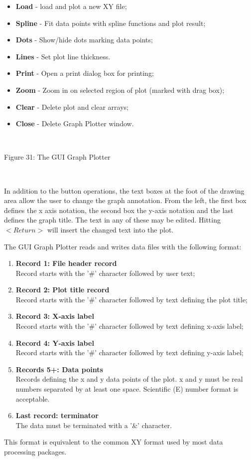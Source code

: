 \begin{itemize}
\item {\bf Load} - load and plot a new XY file;
\item {\bf Spline} - Fit data points with spline functions and plot result;
\item {\bf Dots} - Show/hide dots marking data points;
\item {\bf Lines} - Set plot line thickness.
\item {\bf Print} - Open a print dialog box for printing;
\item {\bf Zoom} - Zoom in on selected region of plot (marked with drag box);
\item {\bf Clear} - Delete plot and clear arrays;
\item {\bf Close} - Delete Graph Plotter window.
\end{itemize}

~

\begin{center}
\centerline{}
\centerline{Figure 31: The GUI Graph Plotter}
\end{center}

~

\noindent
In addition to the button operations, the text boxes at the foot of
the drawing area allow the user to change the graph annotation. From
the left, the first box defines the x axis notation, the second
box the y-axis notation and the last defines the graph title. The text
in any of these may be edited. Hitting $<Return>$ will insert the
changed text into the plot.

The GUI Graph Plotter reads and writes data files with the following
format:
\begin{enumerate}
\item {\bf Record 1: File header record}\\
Record starts with the '\#' character followed by user text;
\item {\bf Record 2: Plot title record}\\
Record starts with the '\#' character followed by text defining
the plot title;
\item {\bf Record 3: X-axis label}\\
Record starts with the '\#' character followed by text defining
x-axis label;
\item {\bf Record 4: Y-axis label}\\
Record starts with the '\#' character followed by text defining
y-axis label;
\item {\bf Records 5+: Data points}\\
Records defining the x and y data points of the plot. x and y must be
real numbers separated by at least one space. Scientific (E) number format
is acceptable.
\item {\bf Last record: terminator}\\
The data must be terminated with a '\&' character.
\end{enumerate}
This format is equivalent to the common XY format used by most data
processing packages.

